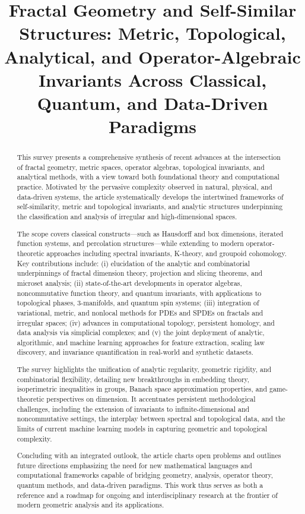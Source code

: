 \title{Fractal Geometry and Self-Similar Structures: Metric, Topological, Analytical, and Operator-Algebraic Invariants Across Classical, Quantum, and Data-Driven Paradigms}
\maketitle

\begin{abstract}
This survey presents a comprehensive synthesis of recent advances at the intersection of fractal geometry, metric spaces, operator algebras, topological invariants, and analytical methods, with a view toward both foundational theory and computational practice. Motivated by the pervasive complexity observed in natural, physical, and data-driven systems, the article systematically develops the intertwined frameworks of self-similarity, metric and topological invariants, and analytic structures underpinning the classification and analysis of irregular and high-dimensional spaces. 

The scope covers classical constructs—such as Hausdorff and box dimensions, iterated function systems, and percolation structures—while extending to modern operator-theoretic approaches including spectral invariants, K-theory, and groupoid cohomology. Key contributions include: (i) elucidation of the analytic and combinatorial underpinnings of fractal dimension theory, projection and slicing theorems, and microset analysis; (ii) state-of-the-art developments in operator algebras, noncommutative function theory, and quantum invariants, with applications to topological phases, 3-manifolds, and quantum spin systems; (iii) integration of variational, metric, and nonlocal methods for PDEs and SPDEs on fractals and irregular spaces; (iv) advances in computational topology, persistent homology, and data analysis via simplicial complexes; and (v) the joint deployment of analytic, algorithmic, and machine learning approaches for feature extraction, scaling law discovery, and invariance quantification in real-world and synthetic datasets.

The survey highlights the unification of analytic regularity, geometric rigidity, and combinatorial flexibility, detailing new breakthroughs in embedding theory, isoperimetric inequalities in groups, Banach space approximation properties, and game-theoretic perspectives on dimension. It accentuates persistent methodological challenges, including the extension of invariants to infinite-dimensional and noncommutative settings, the interplay between spectral and topological data, and the limits of current machine learning models in capturing geometric and topological complexity.

Concluding with an integrated outlook, the article charts open problems and outlines future directions emphasizing the need for new mathematical languages and computational frameworks capable of bridging geometry, analysis, operator theory, quantum methods, and data-driven paradigms. This work thus serves as both a reference and a roadmap for ongoing and interdisciplinary research at the frontier of modern geometric analysis and its applications.
\end{abstract}

